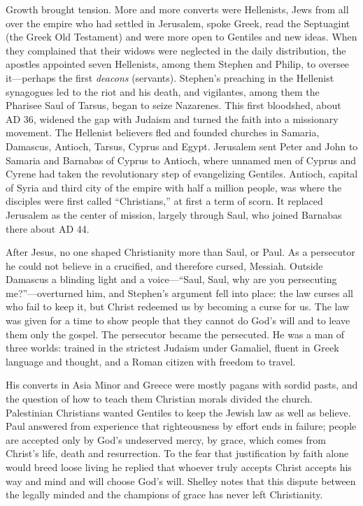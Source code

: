 Growth brought tension. More and more converts were Hellenists, Jews from all over the empire who had
settled in Jerusalem, spoke Greek, read the Septuagint (the Greek Old Testament) and were more open to
Gentiles and new ideas. When they complained that their widows were neglected in the daily
distribution, the apostles appointed seven Hellenists, among them Stephen and Philip, to oversee
it---perhaps the first \emph{deacons} (servants). Stephen's preaching in the Hellenist synagogues led
to the riot and his death, and vigilantes, among them the Pharisee Saul of Tarsus, began to seize
Nazarenes. This first bloodshed, about AD 36, widened the gap with Judaism and turned the faith into a
missionary movement. The Hellenist believers fled and founded churches in Samaria, Damascus, Antioch,
Tarsus, Cyprus and Egypt. Jerusalem sent Peter and John to Samaria and Barnabas of Cyprus to Antioch,
where unnamed men of Cyprus and Cyrene had taken the revolutionary step of evangelizing Gentiles.
Antioch, capital of Syria and third city of the empire with half a million people, was where the
disciples were first called ``Christians,'' at first a term of scorn. It replaced Jerusalem as the
center of mission, largely through Saul, who joined Barnabas there about AD 44.

After Jesus, no one shaped Christianity more than Saul, or Paul. As a persecutor he could not believe in
a crucified, and therefore cursed, Messiah. Outside Damascus a blinding light and a voice---``Saul,
Saul, why are you persecuting me?''---overturned him, and Stephen's argument fell into place: the law
curses all who fail to keep it, but Christ redeemed us by becoming a curse for us. The law was given
for a time to show people that they cannot do God's will and to leave them only the gospel. The
persecutor became the persecuted. He was a man of three worlds: trained in the strictest Judaism under
Gamaliel, fluent in Greek language and thought, and a Roman citizen with freedom to travel.

His converts in Asia Minor and Greece were mostly pagans with sordid pasts, and the question of how to
teach them Christian morals divided the church. Palestinian Christians wanted Gentiles to keep the
Jewish law as well as believe. Paul answered from experience that righteousness by effort ends in
failure; people are accepted only by God's undeserved mercy, by grace, which comes from Christ's life,
death and resurrection. To the fear that justification by faith alone would breed loose living he
replied that whoever truly accepts Christ accepts his way and mind and will choose God's will. Shelley
notes that this dispute between the legally minded and the champions of grace has never left
Christianity.

